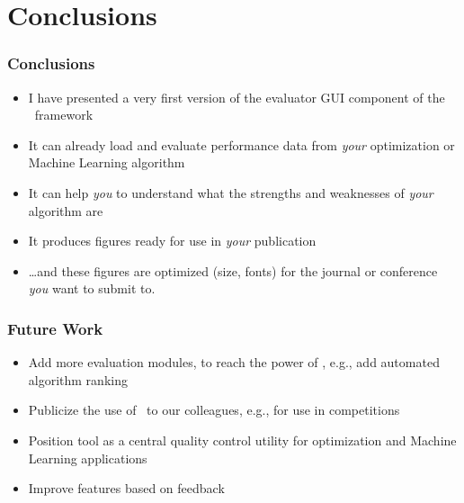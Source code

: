 \section{Conclusions}%
%
\begin{frame}%
\frametitle{Conclusions}%
\begin{itemize}%
\item I have presented a very first version of the evaluator GUI component of the \optimizationBenchmarking\ framework%
\item<2-> It can already load and evaluate performance data from \emph{your} optimization or Machine Learning algorithm%
\item<3-> It can help \emph{you} to understand what the strengths and weaknesses of \emph{your} algorithm are%
\item<4-> It produces figures ready for use in \emph{your} publication%
\item<5-> {\dots}and these figures are optimized (size, fonts) for the journal or conference \emph{you} want to submit to.%
\end{itemize}%
\end{frame}
%
%
\begin{frame}%
\frametitle{Future Work}%
\begin{itemize}%
\item Add more evaluation modules, to reach the power of \tspSuite\expandafter\scitep{\tspSuiteReferences}, e.g., add automated algorithm ranking%
\item<2-> Publicize the use of \optimizationBenchmarking\ to our colleagues, e.g., for use in competitions%
\item<3-> Position tool as a central quality control utility for optimization and Machine Learning applications%
\item<4-> Improve features based on feedback%
\end{itemize}%
\end{frame}%